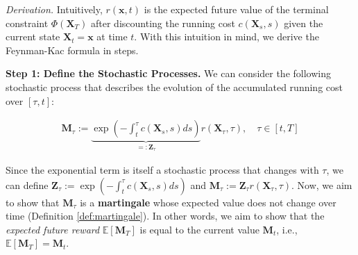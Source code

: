 \documentclass{article}
\begin{document}
\textit{Derivation.} Intuitively, $r(\boldsymbol{x},t)$ is the expected future value of the terminal constraint $\Phi(\boldsymbol{X}_T)$ after discounting the running cost $c(\boldsymbol{X}_s,s)$ given the current state $\boldsymbol{X}_t=\boldsymbol{x}$ at time $t$. With this intuition in mind, we derive the Feynman-Kac formula in steps.

\textbf{Step 1: Define the Stochastic Processes. }
We can consider the following stochastic process that describes the evolution of the accumulated running cost over $[\tau,t]$:
\begin{small}
\begin{align}
    \boldsymbol{M}_\tau:=\underbrace{\exp \left(-\int_t^\tau c(\boldsymbol{X}_s,s)ds\right)}_{=:\boldsymbol{Z}_\tau}r(\boldsymbol{X}_\tau,\tau), \quad \tau\in [t,T]\label{eq:fp-proof4}
\end{align}
\end{small}
Since the exponential term is itself a stochastic process that changes with $\tau$, we can define $\boldsymbol{Z}_\tau:=\exp \left(-\int_t^\tau c(\boldsymbol{X}_s,s)ds\right)$ and $\boldsymbol{M}_\tau:=\boldsymbol{Z}_\tau r(\boldsymbol{X}_\tau,\tau)$. Now, we aim to show that $\boldsymbol{M}_\tau$ is a \textbf{martingale} whose expected value does not change over time (Definition \ref{def:martingale}). In other words, we aim to show that the \textit{expected future reward} $\mathbb{E}[\boldsymbol{M}_T]$ is equal to the current value $\boldsymbol{M}_t$, i.e., $\mathbb{E}[\boldsymbol{M}_T]=\boldsymbol{M}_t$.
\end{document}
